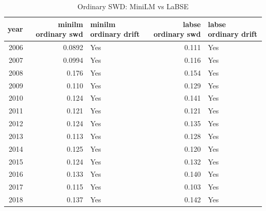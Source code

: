 \begin{table}[ht]
\centering
\caption{Ordinary SWD: MiniLM vs LaBSE}
\label{tab:minilm_vs_labse_ordinary_swd}
\begin{tabular}{rrlrl}
\toprule
year & minilm ordinary swd & minilm ordinary drift & labse ordinary swd & labse ordinary drift \\
\midrule
2006 & 0.0892 & Yes & 0.111 & Yes \\
2007 & 0.0994 & Yes & 0.116 & Yes \\
2008 & 0.176 & Yes & 0.154 & Yes \\
2009 & 0.110 & Yes & 0.129 & Yes \\
2010 & 0.124 & Yes & 0.141 & Yes \\
2011 & 0.121 & Yes & 0.121 & Yes \\
2012 & 0.124 & Yes & 0.135 & Yes \\
2013 & 0.113 & Yes & 0.128 & Yes \\
2014 & 0.125 & Yes & 0.120 & Yes \\
2015 & 0.124 & Yes & 0.132 & Yes \\
2016 & 0.133 & Yes & 0.140 & Yes \\
2017 & 0.115 & Yes & 0.103 & Yes \\
2018 & 0.137 & Yes & 0.142 & Yes \\
\bottomrule
\end{tabular}
\end{table}
